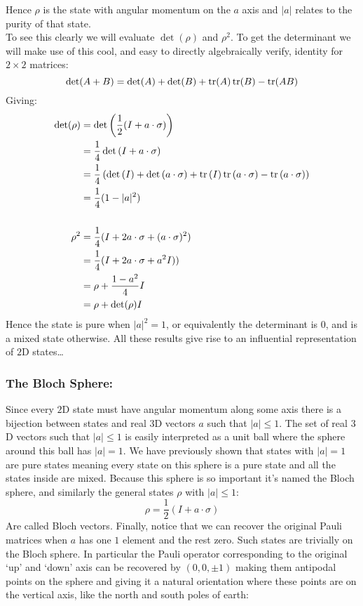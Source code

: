 Hence $\rho$ is the state with angular momentum on the $a$ axis and $|a|$ relates to the purity of that state.
\\

To see this clearly we will evaluate $\det(\rho)$ and $\rho^2$.
To get the determinant we will make use of this cool,
and easy to directly algebraically verify, 
identity for $2\times2$ matrices:
\[\det(A+B) = \det(A)+\det(B) +\operatorname{tr}(A)\operatorname{tr}(B)-\operatorname{tr}(AB)\]
Giving:
\[\begin{aligned}
	\det(\rho)&=\det\left(\frac{1}{2}(I+a\cdot\sigma)\right) \\
	&=\frac{1}{4}\det\left(I+a\cdot\sigma\right) \\
	&=\frac{1}{4}\left(\det\left(I\right)+\det\left(a\cdot\sigma\right) +\operatorname{tr}\left(I\right)\operatorname{tr}\left(a\cdot\sigma\right)-\operatorname{tr}\left(a\cdot\sigma\right)\right)\\
	&=\frac{1}{4}(1-|a|^2)\\\\
	\rho^2 &= \frac{1}{4}(I+2a\cdot\sigma+(a\cdot\sigma)^2)\\
	&= \frac{1}{4}(I+2a\cdot\sigma+a^2I))\\
	&= \rho +\frac{1-a^2}{4}I\\
	&= \rho +\det(\rho)I\\
\end{aligned}\]
Hence the state is pure when $|a|^2=1$,
or equivalently the determinant is $0$,
and is a mixed state otherwise.
All these results give rise to an influential representation of $2$D states\ldots

\subsubsection{The Bloch Sphere:}
Since every $2$D state must have angular momentum along some axis there is a bijection between states and real $3$D vectors $a$ such that $|a|\leq1$.
The set of real $3$D vectors such that $|a|\leq1$ is easily interpreted as a unit ball where the sphere around this ball has $|a|=1$.
We have previously shown that states with $|a|=1$ are pure states meaning every state on this sphere is a pure state and all the states inside are mixed.
Because this sphere is so important it's named the Bloch sphere,
and similarly the general states $\rho$ with $|a|\leq 1$:
\[\rho = \frac{1}{2}(I+a\cdot\sigma)\]
Are called Bloch vectors.
Finally,
notice that we can recover the original Pauli matrices when $a$ has one $1$ element and the rest zero.
Such states are trivially on the Bloch sphere.
In particular the Pauli operator corresponding to the original `up' and `down' axis can be recovered by $(0,0,\pm1)$ making them antipodal points on the sphere and giving it a natural orientation where these points are on the vertical axis,
like the north and south poles of earth:

